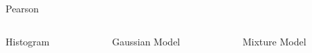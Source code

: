 \begin{block}{}

  \begin{center}
  	Pearson
  \end{center}
  
  
  \begin{columns}[T]
    \begin{column}{.32\textwidth}
    	\centering
    	Histogram
    \end{column}
    
    \begin{column}{.32\textwidth}
    	\centering
    	Gaussian Model
    \end{column}
    
    \begin{column}{.32\textwidth}
    	\centering
    	Mixture Model
    \end{column}
  \end{columns}
  ~
  
  
 \begin{columns}[T]
    \begin{column}{.32\textwidth}
    \end{column}
    
    \begin{column}{.32\textwidth}
    \end{column}
    
    \begin{column}{.32\textwidth}
    \end{column}
  \end{columns}

\end{block}
